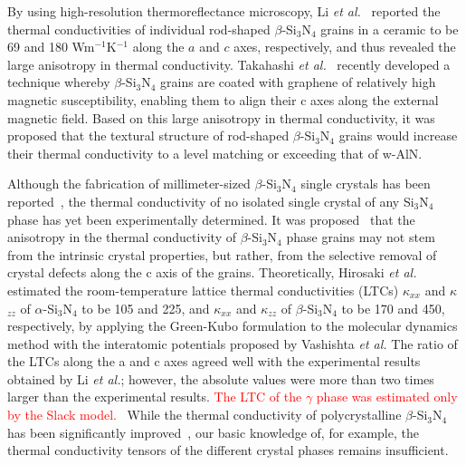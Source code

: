 \documentclass[twocolumn,amsmath,amssymb,a4paper,prb,superscriptaddress,floatfix]{revtex4-1}
\begin{document}
By using high-resolution thermoreflectance microscopy, Li {\it et al.}~\cite{li}
reported the thermal conductivities of individual rod-shaped
$\beta$-Si$_3$N$_4$ grains in a ceramic to be 69 and 180
Wm$^{-1}$K$^{-1}$ along the $a$ and $c$ axes, respectively, and thus
revealed the large anisotropy in thermal conductivity. Takahashi {\it
et al.}~\cite{takahashi} recently developed a technique whereby $\beta$-Si$_3$N$_4$
grains are coated with graphene of relatively high magnetic
susceptibility, enabling them to align their c axes along the external
magnetic field. Based on this large anisotropy in thermal
conductivity, it was proposed that the textural structure of rod-shaped
$\beta$-Si$_3$N$_4$ grains would increase their thermal conductivity to
a level matching or exceeding that of w-AlN.

Although the fabrication of millimeter-sized $\beta$-Si$_3$N$_4$ single
crystals has been reported~\cite{yamamoto}, the thermal conductivity of no isolated
single crystal of any Si$_3$N$_4$ phase has yet been experimentally
determined. It was proposed~\cite{watari-trans} that the anisotropy in the thermal
conductivity of $\beta$-Si$_3$N$_4$ phase grains may not stem from the
intrinsic crystal properties, but rather, from the selective removal of
crystal defects along the c axis of the grains. Theoretically,
Hirosaki {\it et al.}~\cite{hirosaki-md} estimated the room-temperature lattice thermal
conductivities (LTCs) $\kappa$$_{xx}$ and $\kappa$$_{zz}$ of
$\alpha$-Si$_3$N$_4$ to be 105 and 225, and $\kappa$$_{xx}$ and
$\kappa$$_{zz}$ of $\beta$-Si$_3$N$_4$ to be 170 and 450, respectively,
by applying the Green-Kubo formulation to the molecular dynamics method
with the interatomic potentials proposed by Vashishta {\it et al.} The
ratio of the LTCs along the a and c axes agreed well with the
experimental results obtained by Li {\it et al.}; however, the absolute
values were more than two times larger than the experimental results.
%
\textcolor{red}{The LTC of the $\gamma$ phase was estimated only by the
Slack model.~\cite{morelli}}
%
While the thermal conductivity of polycrystalline $\beta$-Si$_3$N$_4$
has been significantly improved~\cite{zhou,hirao,watari,hirosaki}, our basic knowledge of, for example,
the thermal conductivity tensors of the different crystal phases remains 
insufficient.
   
\end{document}

